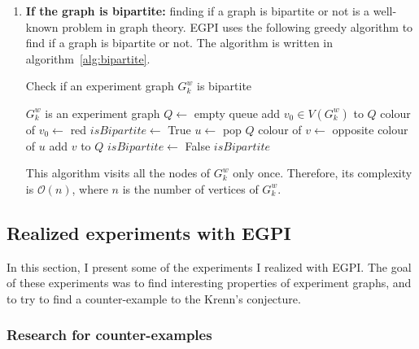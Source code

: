 \begin{enumerate}
    \item \textbf{If the graph is bipartite:} finding if a graph is bipartite or not is a well-known problem in graph theory.
        EGPI uses the following greedy algorithm to find if a graph is bipartite or not.
        The algorithm is written in algorithm~\ref{alg:bipartite}.
        \begin{algorithm}
            \caption{Check if an experiment graph $G_k^w$ is bipartite}
            \label{alg:bipartite}
            \begin{algorithmic}
                \Require $G_k^w$ is an experiment graph
                \State $Q \gets$ empty queue
                \State add $v_0 \in V(G_k^w)$ to $Q$
                \State colour of $v_0 \gets$ red
                \State $isBipartite \gets$ True
                    \State $u \gets$ pop $Q$
                            \State colour of $v \gets$ opposite colour of $u$
                            \State add $v$ to $Q$
                            \State $isBipartite \gets$ False
                        \EndIf
                    \EndFor
                \EndWhile
                \State \Return $isBipartite$
            \end{algorithmic}
        \end{algorithm}

        This algorithm visits all the nodes of $G_k^w$ only once.
        Therefore, its complexity is $\mathcal{O}(n)$, where $n$ is the number of vertices of $G_k^w$.

\end{enumerate}


\subsection{Realized experiments with EGPI}
\label{subsec:realized_experiments}

In this section, I present some of the experiments I realized with EGPI. The goal of these experiments was to find interesting properties of experiment graphs, and to try to find a counter-example to the Krenn's conjecture.\\

\subsubsection{Research for counter-examples}

